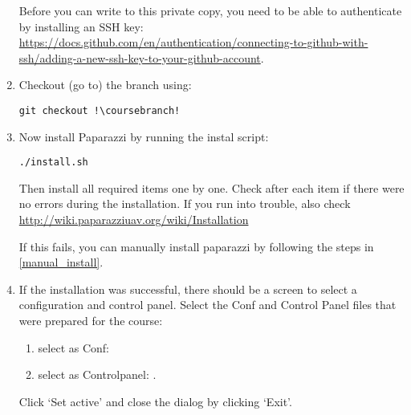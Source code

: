 \begin{enumerate}
	Before you can write to this private copy, you need to be able to authenticate by installing an SSH key: \href{https://docs.github.com/en/authentication/connecting-to-github-with-ssh/adding-a-new-ssh-key-to-your-github-account}{https://docs.github.com/en/authentication/connecting-to-github-with-ssh/adding-a-new-ssh-key-to-your-github-account}.

	\item Checkout (go to) the \coursebranch{} branch using:
	\begin{lstlisting}[style=Bash]
		git checkout !\coursebranch!
	\end{lstlisting}

	\item Now install Paparazzi by running the instal script:
	\begin{lstlisting}[style=Bash]
		./install.sh
	\end{lstlisting}

	Then install all required items one by one. Check after each item if there were no errors during the installation. If you run into trouble, also check \url{http://wiki.paparazziuav.org/wiki/Installation}

	If this fails, you can manually install paparazzi by following the steps in \autoref{manual_install}.
	
	\item If the installation was successful, there should be a screen to select a configuration and control panel. Select the Conf and Control Panel files that were prepared for the course:
	\begin{enumerate}
	\item select as Conf: \\
	\item select as Controlpanel: .\\
	\end{enumerate}
	Click `Set active' and close the dialog by clicking `Exit'.
	

	

\end{enumerate}

